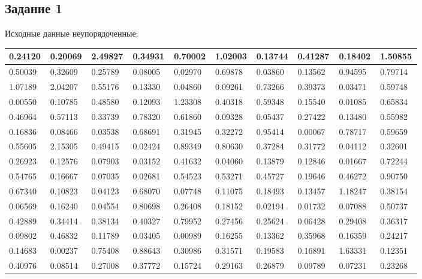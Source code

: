 \subsection{Задание 1}%
\label{subsec:1}%
Исходные данные неупорядоченные:\newline%
\newline%
%
\begin{changemargin}{-4cm}{0cm}\small{%
\begin{tabular}{|p{0.08\linewidth}|p{0.08\linewidth}|p{0.08\linewidth}|p{0.08\linewidth}|p{0.08\linewidth}|p{0.08\linewidth}|p{0.08\linewidth}|p{0.08\linewidth}|p{0.08\linewidth}|p{0.08\linewidth}|}%
\hline%
0.24120&0.20069&2.49827&0.34931&0.70002&1.02003&0.13744&0.41287&0.18402&1.50855\\%
\hline%
0.50039&0.32609&0.25789&0.08005&0.02970&0.69878&0.03860&0.13562&0.94595&0.79714\\%
\hline%
1.07189&2.04207&0.55176&0.13330&0.04860&0.09261&0.73266&0.39373&0.03471&0.59748\\%
\hline%
0.00550&0.10785&0.48580&0.12093&1.23308&0.40318&0.59348&0.15540&0.01085&0.65834\\%
\hline%
0.46964&0.57113&0.33739&0.78320&0.61860&0.09328&0.05437&0.27422&0.13480&0.55982\\%
\hline%
0.16836&0.08466&0.03538&0.68691&0.31945&0.32272&0.95414&0.00067&0.78717&0.59659\\%
\hline%
0.55605&2.15305&0.49415&0.02424&0.89349&0.80630&0.37284&0.31772&0.04112&0.32601\\%
\hline%
0.26923&0.12576&0.07903&0.03152&0.41632&0.04060&0.13879&0.12846&0.01667&0.72244\\%
\hline%
0.54765&0.16667&0.07035&0.02681&0.54523&0.53271&0.45727&0.19646&0.46272&0.90750\\%
\hline%
0.67340&0.10823&0.04123&0.68070&0.07748&0.11075&0.18493&0.13457&1.18247&0.38154\\%
\hline%
0.06569&0.16240&0.04554&0.80698&0.26408&0.18152&0.02194&0.01732&0.07088&0.50737\\%
\hline%
0.42889&0.34414&0.38134&0.40327&0.79952&0.27456&0.25624&0.06428&0.29408&0.36317\\%
\hline%
0.09802&0.46832&0.11789&0.03405&0.00989&0.16255&0.13362&0.35968&0.16359&0.24217\\%
\hline%
0.14683&0.00237&0.75408&0.88643&0.30986&0.31571&0.19583&0.16891&1.63331&0.12351\\%
\hline%
0.40976&0.08514&0.27008&0.37772&0.15724&0.29163&0.26879&0.09789&0.07231&0.23268\\%

\end{tabular}}
\end{changemargin}
